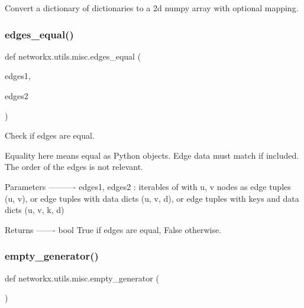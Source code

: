 \begin{DoxyVerb}Convert a dictionary of dictionaries to a 2d numpy array
with optional mapping.\end{DoxyVerb}
 \mbox{\label{namespacenetworkx_1_1utils_1_1misc_afddbff2eb97969114081e94d3efe88d0}} 
\subsubsection{\texorpdfstring{edges\+\_\+equal()}{edges\_equal()}}
{\footnotesize\ttfamily def networkx.\+utils.\+misc.\+edges\+\_\+equal (\begin{DoxyParamCaption}\item[{}]{edges1,  }\item[{}]{edges2 }\end{DoxyParamCaption})}

\begin{DoxyVerb}Check if edges are equal.

Equality here means equal as Python objects.
Edge data must match if included.
The order of the edges is not relevant.

Parameters
----------
edges1, edges2 : iterables of with u, v nodes as
    edge tuples (u, v), or
    edge tuples with data dicts (u, v, d), or
    edge tuples with keys and data dicts (u, v, k, d)

Returns
-------
bool
    True if edges are equal, False otherwise.
\end{DoxyVerb}
 \mbox{\label{namespacenetworkx_1_1utils_1_1misc_a90b806d70b489812901734395285c2bc}} 
\subsubsection{\texorpdfstring{empty\+\_\+generator()}{empty\_generator()}}
{\footnotesize\ttfamily def networkx.\+utils.\+misc.\+empty\+\_\+generator (\begin{DoxyParamCaption}{ }\end{DoxyParamCaption})}

